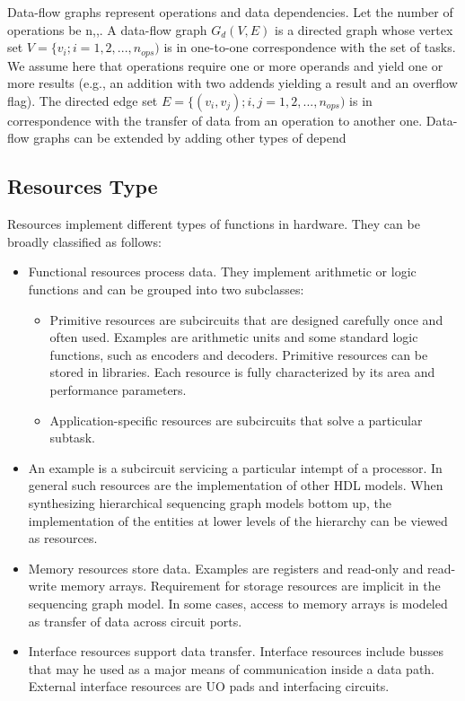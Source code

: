 Data-flow graphs represent operations and data dependencies. Let the number of operations be n,,. A data-flow graph $ G_{d}(V, E) $ is a directed graph whose vertex set $ V = \{v_{i}; i = 1,2,...,n_{ops}) $ is in one-to-one correspondence with the set of tasks. We assume here that operations require one or more operands and yield one or more results (e.g., an addition with two addends yielding a result and an overflow flag). The directed edge set $ E= \{(v_{i},v_{j}); i,j = 1,2,...,n_{ops}) $  is in correspondence with the transfer of data from an operation to another one. Data-flow graphs can be extended by adding other types of depend

\subsection{Resources Type}

Resources implement different types of functions in hardware. They can be broadly classified as follows: 

\begin{itemize}
\item Functional resources process data. They implement arithmetic or logic functions and can be grouped into two subclasses: 

\begin{itemize}
\item  Primitive resources are subcircuits that are designed carefully once and often used. Examples are arithmetic units and some standard logic functions, such as encoders and decoders. Primitive resources can be stored in libraries. Each resource is fully characterized by its area and performance parameters. 
\item  Application-specific resources are subcircuits that solve a particular subtask. 
\end{itemize}

\item An example is a subcircuit servicing a particular intempt of a processor. In general such resources are the implementation of other HDL models. When synthesizing hierarchical sequencing graph models bottom up, the implementation of the entities at lower levels of the hierarchy can be viewed as resources. 


\item Memory resources store data. Examples are registers and read-only and read-write memory arrays. Requirement for storage resources are implicit in the sequencing graph model. In some cases, access to memory arrays is modeled as transfer of data across circuit ports. 


\item Interface resources support data transfer. Interface resources include busses that may he used as a major means of communication inside a data path. External interface resources are UO pads and interfacing circuits. 

\end{itemize}

